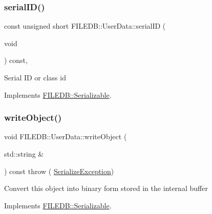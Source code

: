 \mbox{\label{classFILEDB_1_1UserData_a2d1cee48b497ef3f25957ecb1464b7f5}} 
\subsubsection{\texorpdfstring{serialID()}{serialID()}\hspace{0.1cm}{\footnotesize\ttfamily [3/3]}}
{\footnotesize\ttfamily const unsigned short F\+I\+L\+E\+D\+B\+::\+User\+Data\+::serial\+ID (\begin{DoxyParamCaption}\item[{void}]{ }\end{DoxyParamCaption}) const\hspace{0.3cm}{\ttfamily [inline]}, {\ttfamily [virtual]}}

Serial ID or class id 

Implements \mbox{\hyperlink{classFILEDB_1_1Serializable_a5d639b5dbd5d8ebc7dca1eca31bbc868}{F\+I\+L\+E\+D\+B\+::\+Serializable}}.

\mbox{\label{classFILEDB_1_1UserData_a42b5e25b3cba7274363590c5b6861795}} 
\subsubsection{\texorpdfstring{writeObject()}{writeObject()}\hspace{0.1cm}{\footnotesize\ttfamily [1/3]}}
{\footnotesize\ttfamily void F\+I\+L\+E\+D\+B\+::\+User\+Data\+::write\+Object (\begin{DoxyParamCaption}\item[{std\+::string \&}]{ }\end{DoxyParamCaption}) const throw ( \mbox{\hyperlink{classFILEDB_1_1SerializeException}{Serialize\+Exception}}) \hspace{0.3cm}{\ttfamily [virtual]}}

Convert this object into binary form stored in the internal buffer 

Implements \mbox{\hyperlink{classFILEDB_1_1Serializable_a8deaa86e108c08c863881e46cf5578ea}{F\+I\+L\+E\+D\+B\+::\+Serializable}}.

\mbox{\label{classFILEDB_1_1UserData_a42b5e25b3cba7274363590c5b6861795}} 
